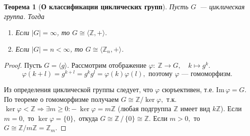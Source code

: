 \documentclass[a4paper, 14pt]{extarticle}
\newcommand{\n}{\par}
\newcommand{\integers}{\mathbb{Z}}
\newcommand{\suchthat}{{:}{-} \ }
\newcommand{\im}{\mathrm{Im} \,}
\renewcommand{\phi}{\varphi}
\theoremstyle{definition}
\theoremstyle{plain}
\newtheorem*{theorem*}{Теорема}
\numberwithin{theorem}{section}
\numberwithin{definition}{section}
\numberwithin{statement}{section}
\numberwithin{lemma}{section}
\numberwithin{consequence}{section}
\begin{document}
		\newpage
		\begin{theorem*}[\textbf{О классификации циклических групп}]
			Пусть $G$~--- циклическая группа. Тогда
			\begin{enumerate}
				\setlength\itemsep{0.1em}
				\item Если $|G| = \infty$, то $G \cong \langle \integers, + \rangle.$
				\item Если $|G| = n < \infty$, то $G \cong \langle \integers_n, + \rangle$.
			\end{enumerate}
		\end{theorem*}
		\begin{proof}
			Пусть ${G = \langle g \rangle.}$ Рассмотрим отображение $\phi{:} \ \integers \rightarrow G, \quad k \mapsto g^k.$
			\begin{equation*}
				\phi(k + l) = g^{k+l} = g^kg^l =
				\phi(k) \phi(l), \text{ поэтому } \phi \text{~--- гомоморфизм.}
			\end{equation*} \n
			 Из определения циклической группы следует, что $\phi$ сюръективен, т.е. $\im \phi = G$. По теореме о гомоморфизме получаем ${G \cong \integers/\ker \phi,}$ т.к. ${\ker \phi < \integers \Longrightarrow \exists m \geqslant 0 \suchthat \ker \phi = m \integers}$ (любая подгруппа $\integers$ имеет вид $k\integers$). Если ${m = 0},$ то ${\ker \phi = \{0\},}$ откуда ${G \cong \integers \, / \, \{0\} \cong \integers.}$ Если ${m > 0,}$ то ${G \cong \integers/m\integers = \integers_m.}$
		\end{proof}

	\newpage
\end{document}
